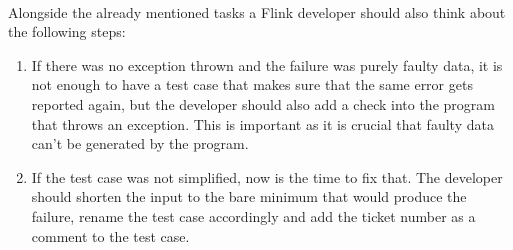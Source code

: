 \paragraph{} Alongside the already mentioned tasks a Flink developer should also think about the following steps:
\begin{enumerate}
  \item If there was no exception thrown and the failure was purely faulty data, it is not enough to have a test case that makes sure that the same error gets reported again, but the developer should also add a check into the program that throws an exception. This is important as it is crucial that faulty data can't be generated by the program.
  \item If the test case was not simplified, now is the time to fix that. The developer should shorten the input to the bare minimum that would produce the failure, rename the test case accordingly and add the ticket number as a comment to the test case.
\end{enumerate}
